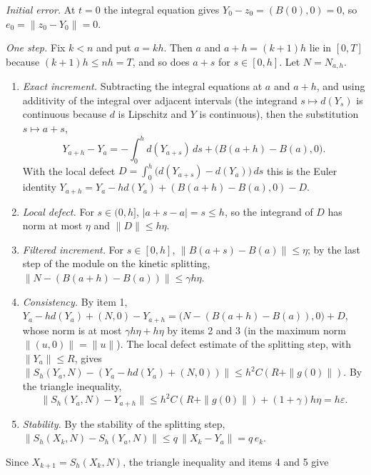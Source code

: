 \documentclass[11pt,a4paper]{article}
\begin{document}
\emph{Initial error.} At \(t=0\) the integral equation gives \(Y_0-z_0=(B(0),0)=0\), so \(e_0=\|z_0-Y_0\|=0\).




\emph{One step.} Fix \(k<n\) and put \(a=kh\). Then \(a\) and \(a+h=(k+1)h\) lie in \([0,T]\) because \((k+1)h\le nh=T\), and so does \(a+s\) for \(s\in[0,h]\). Let \(N=N_{a,h}\).



\begin{enumerate}


\item \emph{Exact increment.} Subtracting the integral equations at \(a\) and \(a+h\), and using additivity of the integral over adjacent intervals (the integrand \(s\mapsto d(Y_s)\) is continuous because \(d\) is Lipschitz and \(Y\) is continuous), then the substitution \(s\mapsto a+s\),
\[Y_{a+h}-Y_a=-\int_0^hd(Y_{a+s})\,ds+\bigl(B(a+h)-B(a),0\bigr).\]
With the local defect \(D=\int_0^h\bigl(d(Y_{a+s})-d(Y_a)\bigr)\,ds\) this is the Euler identity \(Y_{a+h}=Y_a-hd(Y_a)+(B(a+h)-B(a),0)-D\).

\item \emph{Local defect.} For \(s\in(0,h]\), \(|a+s-a|=s\le h\), so the integrand of \(D\) has norm at most \(\eta\) and \(\|D\|\le h\eta\).

\item \emph{Filtered increment.} For \(s\in[0,h]\), \(\|B(a+s)-B(a)\|\le\eta\); by the last step of the module on the kinetic splitting, \(\|N-(B(a+h)-B(a))\|\le\gamma h\eta\).

\item \emph{Consistency.} By item 1, \(Y_a-hd(Y_a)+(N,0)-Y_{a+h}=\bigl(N-(B(a+h)-B(a)),0\bigr)+D\), whose norm is at most \(\gamma h\eta+h\eta\) by items 2 and 3 (in the maximum norm \(\|(u,0)\|=\|u\|\)). The local defect estimate of the splitting step, with \(\|Y_a\|\le R\), gives \(\|S_h(Y_a,N)-(Y_a-hd(Y_a)+(N,0))\|\le h^2C(R+\|g(0)\|)\). By the triangle inequality,
\[\|S_h(Y_a,N)-Y_{a+h}\|\le h^2C(R+\|g(0)\|)+(1+\gamma)h\eta=h\varepsilon .\]

\item \emph{Stability.} By the stability of the splitting step, \(\|S_h(X_k,N)-S_h(Y_a,N)\|\le q\,\|X_k-Y_a\|=q\,e_k\).

\end{enumerate}



Since \(X_{k+1}=S_h(X_k,N)\), the triangle inequality and items 4 and 5 give
\end{document}
